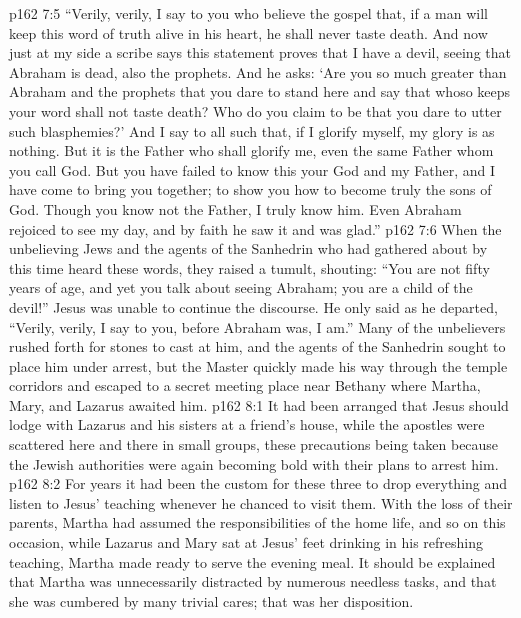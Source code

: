 \vs p162 7:5 \textcolor{ubdarkred}{“Verily, verily, I say to you who believe the gospel that, if a man will keep this word of truth alive in his heart, he shall never taste death. And now just at my side a scribe says this statement proves that I have a devil, seeing that Abraham is dead, also the prophets. And he asks: ‘Are you so much greater than Abraham and the prophets that you dare to stand here and say that whoso keeps your word shall not taste death? Who do you claim to be that you dare to utter such blasphemies?’ And I say to all such that, if I glorify myself, my glory is as nothing. But it is the Father who shall glorify me, even the same Father whom you call God. But you have failed to know this your God and my Father, and I have come to bring you together; to show you how to become truly the sons of God. Though you know not the Father, I truly know him. Even Abraham rejoiced to see my day, and by faith he saw it and was glad.”}
\pc \vs p162 7:6 When the unbelieving Jews and the agents of the Sanhedrin who had gathered about by this time heard these words, they raised a tumult, shouting: “You are not fifty years of age, and yet you talk about seeing Abraham; you are a child of the devil!” Jesus was unable to continue the discourse. He only said as he departed, \textcolor{ubdarkred}{“Verily, verily, I say to you, before Abraham was, I am.”} Many of the unbelievers rushed forth for stones to cast at him, and the agents of the Sanhedrin sought to place him under arrest, but the Master quickly made his way through the temple corridors and escaped to a secret meeting place near Bethany where Martha, Mary, and Lazarus awaited him.
%
\vs p162 8:1 It had been arranged that Jesus should lodge with Lazarus and his sisters at a friend’s house, while the apostles were scattered here and there in small groups, these precautions being taken because the Jewish authorities were again becoming bold with their plans to arrest him.
\vs p162 8:2 For years it had been the custom for these three to drop everything and listen to Jesus’ teaching whenever he chanced to visit them. With the loss of their parents, Martha had assumed the responsibilities of the home life, and so on this occasion, while Lazarus and Mary sat at Jesus’ feet drinking in his refreshing teaching, Martha made ready to serve the evening meal. It should be explained that Martha was unnecessarily distracted by numerous needless tasks, and that she was cumbered by many trivial cares; that was her disposition.

